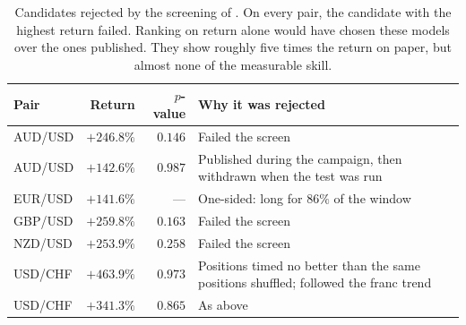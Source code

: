 \begin{table}[htb!]
\centering
\footnotesize
\caption{Candidates rejected by the screening of . On every pair, the candidate with the highest return failed. Ranking on return alone would have chosen these models over the ones published. They show roughly five times the return on paper, but almost none of the measurable skill.}
\label{Tables:BetaTraps}
\begin{tabularx}{\textwidth}{@{}lrrX@{}}
\toprule
\textbf{Pair} & \textbf{Return} & \textbf{$p$-value} & \textbf{Why it was rejected} \\
\midrule
AUD/USD & $+246.8\%$ & $0.146$ & Failed the screen \\
AUD/USD & $+142.6\%$ & $0.987$ & Published during the campaign, then withdrawn when the test was run \\
EUR/USD & $+141.6\%$ & --- & One-sided: long for $86\%$ of the window \\
GBP/USD & $+259.8\%$ & $0.163$ & Failed the screen \\
NZD/USD & $+253.9\%$ & $0.258$ & Failed the screen \\
USD/CHF & $+463.9\%$ & $0.973$ & Positions timed no better than the same positions shuffled; followed the franc trend \\
USD/CHF & $+341.3\%$ & $0.865$ & As above \\
\bottomrule
\end{tabularx}
\end{table}
